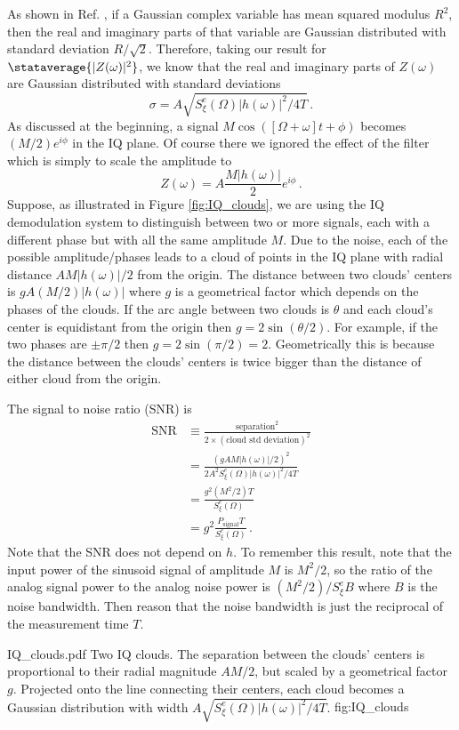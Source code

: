 As shown in Ref. \cite{Sank:whiteNoiseDFT}, if a Gaussian complex variable has mean squared modulus $R^2$, then the real and imaginary parts of that variable are Gaussian distributed with standard deviation $R / \sqrt{2}$.
Therefore, taking our result for $\stataverage{|Z(\omega)|^2}$, we know that the real and imaginary parts of $Z(\omega)$ are Gaussian distributed with standard deviations
\begin{equation}
\sigma = A \sqrt{S^e_\xi(\Omega) |h(\omega)|^2 / 4 T} \, .
\end{equation}
As discussed at the beginning, a signal $M \cos([\Omega + \omega] t + \phi)$ becomes $(M/2)e^{i \phi}$ in the IQ plane.
Of course there we ignored the effect of the filter which is simply to scale the amplitude to
\begin{equation}
Z(\omega) = A \frac{M |h(\omega)|}{2} e^{i \phi} \, .
\end{equation}
Suppose, as illustrated in Figure \ref{fig:IQ_clouds}, we are using the IQ demodulation system to distinguish between two or more signals, each with a different phase but with all the same amplitude $M$.
Due to the noise, each of the possible amplitude/phases leads to a cloud of points in the IQ plane with radial distance $A M |h(\omega)|/2$ from the origin.
The distance between two clouds' centers is $g A (M/2)|h(\omega)|$ where $g$ is a geometrical factor which depends on the phases of the clouds.
If the arc angle between two clouds is $\theta$ and each cloud's center is equidistant from the origin then $g = 2 \sin(\theta / 2)$.
For example, if the two phases are $\pm\pi/2$ then $g=2 \sin(\pi/2) = 2$.
Geometrically this is because the distance between the clouds' centers is twice bigger than the distance of either cloud from the origin.

The signal to noise ratio (SNR) is
\begin{align}
\text{SNR}
& \equiv \frac{\text{separation}^2}{2 \times (\text{cloud std deviation})^2} \\
&= \frac{(g A M |h(\omega)|/2)^2}{2 A^2 S^e_\xi(\Omega) |h(\omega)|^2 / 4T} \\
&= \frac{g^2 (M^2/2) T}{S^e_\xi(\Omega)} \\
&= g^2 \frac{P_\text{signal} T}{S^e_\xi(\Omega)}
\, .
\end{align}
Note that the SNR does not depend on $h$.
To remember this result, note that the input power of the sinusoid signal of amplitude $M$ is $M^2/2$, so the ratio of the analog signal power to the analog noise power is $(M^2 / 2) / S^e_\xi B$ where $B$ is the noise bandwidth.
Then reason that the noise bandwidth is just the reciprocal of the measurement time $T$.

{IQ_clouds.pdf}
{Two IQ clouds. The separation between the clouds' centers is proportional to their radial magnitude $A M/2$, but scaled by a geometrical factor $g$. Projected onto the line connecting their centers, each cloud becomes a Gaussian distribution with width $A \sqrt{S^e_\xi(\Omega)|h(\omega)|^2/4T}$.}
{fig:IQ_clouds}

